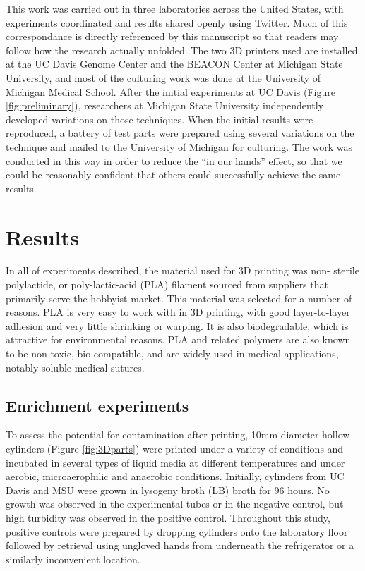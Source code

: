 \documentclass[fleqn,10pt]{wlpeerj}
\begin{document}
This work was carried out in three laboratories across the United States, with
experiments coordinated and results shared openly using Twitter. Much of this
correspondance is directly referenced by this manuscript so that readers may
follow how the research actually unfolded. The two 3D printers used are
installed at the UC Davis Genome Center and the BEACON Center at Michigan
State University, and most of the culturing work was done at the University of
Michigan Medical School. After the initial experiments at UC Davis (Figure
\ref{fig:preliminary}), researchers at Michigan State University independently
developed variations on those techniques. When the initial results were
reproduced, a battery of test parts were prepared using several variations on
the technique and mailed to the University of Michigan for culturing. The work
was conducted in this way in order to reduce the ``in our hands'' effect, so
that we could be reasonably confident that others could successfully achieve
the same results.


\section{Results}

In all of experiments described, the material used for 3D printing was non-
sterile polylactide, or poly-lactic-acid (PLA) filament sourced from suppliers
that primarily serve the hobbyist market. This material was selected for a
number of reasons. PLA is very easy to work with in 3D printing, with good
layer-to-layer adhesion and very little shrinking or warping. It is also
biodegradable, which is attractive for environmental reasons. PLA and related
polymers are also known to be non-toxic, bio-compatible, and are widely used
in medical applications, notably soluble medical sutures.

\subsection{Enrichment experiments}

To assess the potential for contamination after printing, 10mm diameter hollow
cylinders (Figure \ref{fig:3Dparts}) were printed under a variety of
conditions and incubated in several types of liquid media at different
temperatures and under aerobic, microaerophilic and anaerobic conditions.
Initially, cylinders from UC Davis and MSU were grown in lysogeny broth (LB)
broth for 96 hours. No growth was observed in the experimental tubes or in the
negative control, but high turbidity was observed in the positive control.
Throughout this study, positive controls were prepared by dropping cylinders
onto the laboratory floor followed by retrieval using ungloved hands from
underneath the refrigerator or a similarly inconvenient location.
\end{document}
